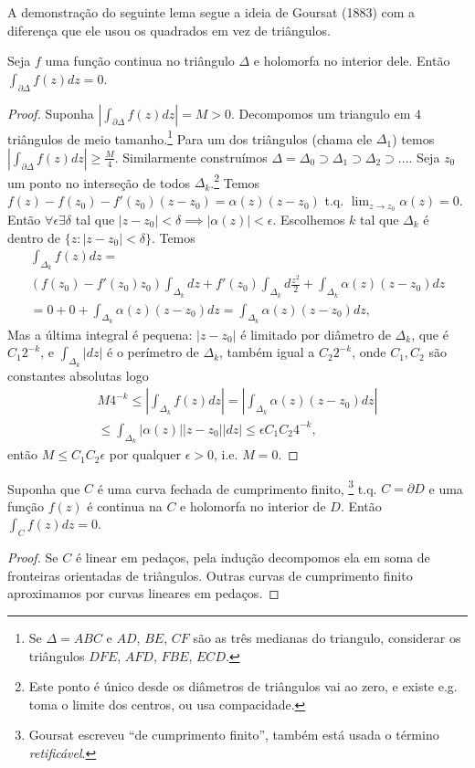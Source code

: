 A demonstração do seguinte lema segue a ideia de Goursat (1883) com a diferença que ele usou
os quadrados em vez de triângulos.
\begin{lema}[Goursat, 1883]
\label{l:goursat}
Seja $f$ uma função continua no triângulo $\Delta$ e holomorfa no interior dele.
Então $\int_{\partial\Delta} f(z) dz = 0$.
\end{lema}
\begin{proof}
Suponha $|\int_{\partial\Delta} f(z) dz| = M > 0$.
Decompomos um triangulo em $4$ triângulos de meio tamanho.\footnote{
Se $\Delta = ABC$ e $AD$, $BE$, $CF$ são as três medianas do triangulo,
considerar os triângulos $DFE$, $AFD$, $FBE$, $ECD$.}
Para um dos triângulos (chama ele $\Delta_1$) temos
$|\int_{\partial\Delta} f(z) dz| \geq \frac{M}{4}$.
Similarmente construímos $\Delta = \Delta_0 \supset \Delta_1 \supset \Delta_2 \supset ...$.
Seja $z_0$ um ponto no interseção de todos $\Delta_k$.\footnote{
Este ponto é único desde os diâmetros de triângulos vai ao zero,
e existe e.g. toma o limite dos centros, ou usa compacidade.}
Temos $f(z) - f(z_0) - f'(z_0) (z-z_0) = \alpha(z) (z-z_0)$ t.q.
$\lim_{z\to z_0} \alpha(z) = 0$. Então $\forall \epsilon \exists \delta$ tal que
$|z-z_0|<\delta \implies |\alpha(z)|<\epsilon$. Escolhemos $k$ tal que
$\Delta_k$ é dentro de $\{z: |z-z_0|<\delta\}$.
Temos
\begin{multline}
\int_{\Delta_k} f(z) dz = \\
(f(z_0)-f'(z_0)z_0) \int_{\Delta_k} dz + f'(z_0) \int_{\Delta_k} d\frac{z^2}{2}
+ \int_{\Delta_k} \alpha(z) (z-z_0) dz \\
= 0 + 0 + \int_{\Delta_k} \alpha(z) (z-z_0) dz = \int_{\Delta_k} \alpha(z) (z-z_0) dz,
\end{multline}
Mas a última integral é pequena: $|z-z_0|$ é limitado por diâmetro de $\Delta_k$,
que é $C_1 2^{-k}$, e $\int_{\Delta_k} |dz|$ é o perímetro de $\Delta_k$, também igual a $C_2 2^{-k}$,
onde $C_1,C_2$ são constantes absolutas
logo
\begin{multline*}
M 4^{-k} \leq |\int_{\Delta_k} f(z) dz| = |\int_{\Delta_k} \alpha(z) (z-z_0) dz| \\
\leq \int_{\Delta_k} |\alpha(z)| |z-z_0| |dz| \leq \epsilon C_1 C_2 4^{-k},
\end{multline*}
então $M \leq C_1 C_2 \epsilon$ por qualquer $\epsilon>0$, i.e. $M=0$.
\end{proof}

\begin{teorema}
\label{t:cauchy}
Suponha que $C$ é uma curva fechada de cumprimento finito,
\footnote{Goursat escreveu ``de cumprimento finito'', também está usada
o término \emph{retificável}.}
t.q. $C = \partial D$
e uma função $f(z)$ é continua na $C$ e holomorfa no interior de $D$. Então
$\int_C f(z) dz = 0$.
\end{teorema}
\begin{proof}
Se $C$ é linear em pedaços, pela indução decompomos ela em soma de fronteiras orientadas de triângulos.
Outras curvas de cumprimento finito aproximamos por curvas lineares em pedaços.
\end{proof}

